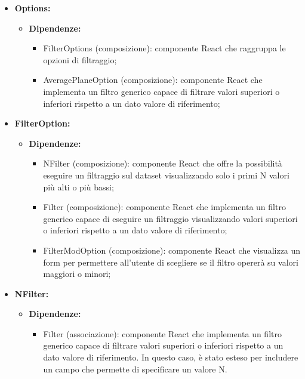 \begin{itemize}
    \item \textbf{Options:}
          \begin{itemize}
              \item \textbf{Dipendenze:}
                    \begin{itemize}
                        \item FilterOptions (composizione): componente React che raggruppa le opzioni di
                              filtraggio;
                        \item AveragePlaneOption (composizione): componente React che implementa un filtro
                              generico capace di filtrare valori superiori o inferiori rispetto a un dato
                              valore di riferimento;
                    \end{itemize}
          \end{itemize}

    \item \textbf{FilterOption:}
          \begin{itemize}
              \item \textbf{Dipendenze:}
                    \begin{itemize}
                        \item NFilter (composizione): componente React che offre la possibilità eseguire un
                              filtraggio sul dataset visualizzando solo i primi N valori più alti o più
                              bassi;
                        \item Filter (composizione): componente React che implementa un filtro generico
                              capace di eseguire un filtraggio visualizzando valori superiori o inferiori
                              rispetto a un dato valore di riferimento;
                        \item FilterModOption (composizione): componente React che visualizza un form per
                              permettere all'utente di scegliere se il filtro opererà su valori maggiori o
                              minori;
                    \end{itemize}
          \end{itemize}

    \item \textbf{NFilter:}
          \begin{itemize}
              \item \textbf{Dipendenze:}
                    \begin{itemize}
                        \item Filter (associazione): componente React che implementa un filtro generico
                              capace di filtrare valori superiori o inferiori rispetto a un dato valore di
                              riferimento. In questo caso, è stato esteso per includere un campo che permette
                              di specificare un valore N.
                    \end{itemize}
          \end{itemize}
\end{itemize}

